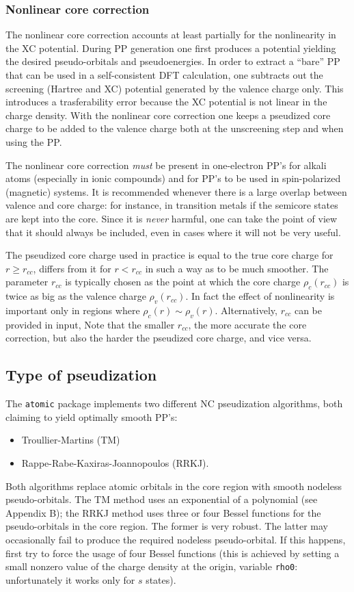 \documentclass[12pt,a4paper]{article}
\begin{document}
\subsubsection{Nonlinear core correction}
\label{nlcc}
The nonlinear core correction\cite{CoreCorr} 
accounts at least partially for the nonlinearity
in the XC potential. During PP generation one first
produces a potential yielding the desired pseudo-orbitals and
pseudoenergies. In order to extract a ``bare'' PP that can be used
in a self-consistent DFT calculation, one subtracts out the screening 
(Hartree and XC) potential generated by the valence 
charge only. This introduces a trasferability error because the XC 
potential is not
linear in the charge density. With the nonlinear core correction one 
keeps a pseudized core charge to be added to the valence charge both 
at the unscreening step and when using the PP.

The nonlinear core correction {\em must} be present in one-electron PP's for
alkali atoms (especially in ionic compounds) and for PP's to be used in 
spin-polarized (magnetic) systems. It is recommended whenever there is a 
large overlap between valence and core charge: for instance, in transition 
metals if the semicore states are kept into the core. Since it is {\em never}
harmful, one can take the point of view that it should always be included,
even in cases where it will not be very useful.

The pseudized core charge used in practice is equal to the true
core charge for $r\ge r_{cc}$, differs from it  for $r < r_{cc}$
in such a way as to be much smoother. The parameter $r_{cc}$ is
typically chosen as the point at which the core charge $\rho_c(r_{cc})$ 
is twice as big as the valence charge $\rho_v(r_{cc})$. In fact the 
effect of nonlinearity is important only in regions where 
$\rho_c(r)\sim\rho_v(r)$. Alternatively, $r_{cc}$ can be provided 
in input, Note that the smaller $r_{cc}$, the more accurate the core 
correction, but also the harder the pseudized core charge, and vice versa.

\subsection{Type of pseudization}
\label{pseudization}
The \texttt{atomic} package implements two different NC pseudization 
algorithms, both claiming to yield optimally smooth PP's:
\begin{itemize}
\item Troullier-Martins \cite{TM} (TM) 
\item Rappe-Rabe-Kaxiras-Joannopoulos \cite{RRKJ} (RRKJ).
\end{itemize}
Both algorithms replace atomic orbitals in the core region 
with smooth nodeless pseudo-orbitals. The TM method uses an
exponential of a polynomial (see Appendix B); the RRKJ method 
uses three or four Bessel functions for the pseudo-orbitals in
the core region. The former is very robust. The latter may 
occasionally fail to produce the required nodeless pseudo-orbital.
If this happens, first try to force the usage of four Bessel functions
(this is achieved by setting a  small nonzero value of 
the charge density at the origin, variable \texttt{rho0}:
unfortunately it works only for $s$ states).
\end{document}
